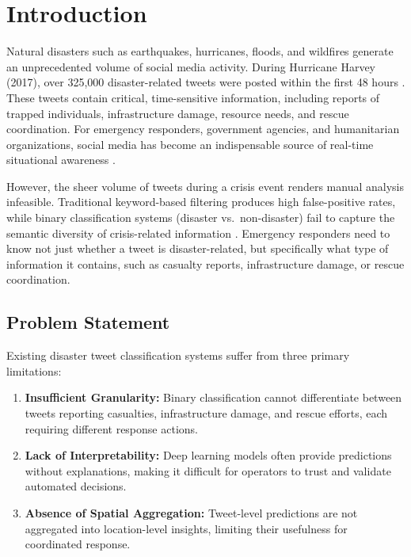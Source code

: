 \documentclass[pdflatex,sn-mathphys-num]{sn-jnl}%
\theoremstyle{thmstyleone}%
\theoremstyle{thmstyletwo}%
\theoremstyle{thmstylethree}%
\begin{document}
\maketitle

\section{Introduction}

Natural disasters such as earthquakes, hurricanes, floods, and wildfires generate an unprecedented volume of social media activity. During Hurricane Harvey (2017), over 325,000 disaster-related tweets were posted within the first 48 hours \cite{ref1}. These tweets contain critical, time-sensitive information, including reports of trapped individuals, infrastructure damage, resource needs, and rescue coordination. For emergency responders, government agencies, and humanitarian organizations, social media has become an indispensable source of real-time situational awareness \cite{ref2}.

However, the sheer volume of tweets during a crisis event renders manual analysis infeasible. Traditional keyword-based filtering produces high false-positive rates, while binary classification systems (disaster vs.\ non-disaster) fail to capture the semantic diversity of crisis-related information \cite{ref3}. Emergency responders need to know not just whether a tweet is disaster-related, but specifically what type of information it contains, such as casualty reports, infrastructure damage, or rescue coordination.

\subsection{Problem Statement}

Existing disaster tweet classification systems suffer from three primary limitations:

\begin{enumerate}
    \item \textbf{Insufficient Granularity:} Binary classification cannot differentiate between tweets reporting casualties, infrastructure damage, and rescue efforts, each requiring different response actions.
    
    \item \textbf{Lack of Interpretability:} Deep learning models often provide predictions without explanations, making it difficult for operators to trust and validate automated decisions.
    
    \item \textbf{Absence of Spatial Aggregation:} Tweet-level predictions are not aggregated into location-level insights, limiting their usefulness for coordinated response.
\end{enumerate}
\end{document}
